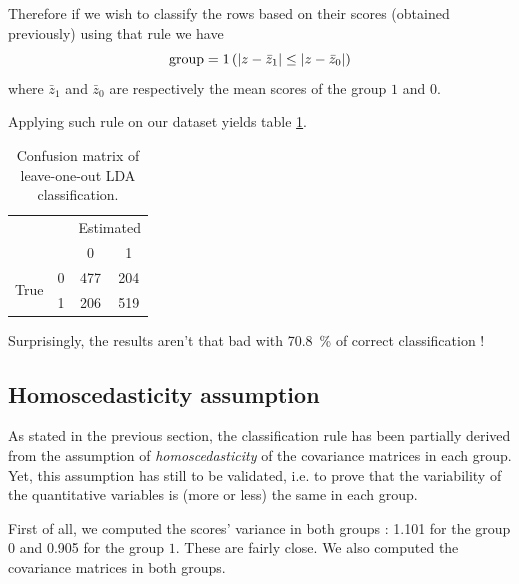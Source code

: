 \documentclass[a4paper, 12pt]{article}
\begin{document}
	
	
	Therefore if we wish to classify the rows based on their scores (obtained previously) using that rule we have
	$$\text{group} = 1\left(\left|z - \bar{z}_1\right| \leq \left|z - \bar{z}_0\right|\right)$$
	where $\bar{z}_1$ and $\bar{z}_0$ are respectively the mean scores of the group $1$ and $0$.
	
	Applying such rule on our dataset yields table \ref{tab:conf_mat}.
	
	\begin{table}[h]
        \centering
        \begin{tabular}{cc|cc}
                                    &   & \multicolumn{2}{c}{Estimated} \\
                                    &   & 0                 & 1         \\ \hline
              \multirow{2}{*}{True} & 0 & 477               & 204       \\
                                    & 1 & 206               & 519             
        \end{tabular}
        \caption{Confusion matrix of leave-one-out LDA classification.}
        \label{tab:conf_mat}
    \end{table}
    
    Surprisingly, the results aren't that bad with \SI{70.8}{\percent} of correct classification !
    
    \subsection{Homoscedasticity assumption}
    
    As stated in the previous section, the classification rule has been partially derived from the assumption of \emph{homoscedasticity} of the covariance matrices in each group. Yet, this assumption has still to be validated, i.e. to prove that the variability of the quantitative variables is (more or less) the same in each group.
    
    First of all, we computed the scores' variance in both groups : \num{1.101} for the group $0$ and \num{0.905} for the group $1$. These are fairly close. We also computed the covariance matrices in both groups.
    
\end{document}
